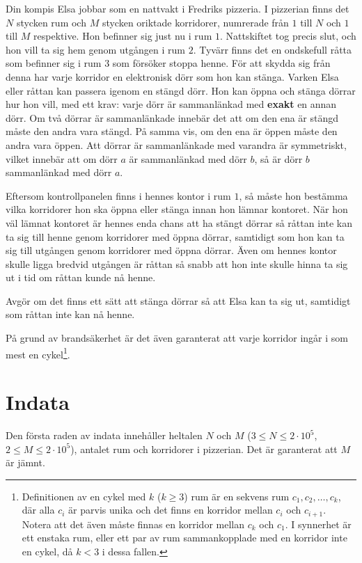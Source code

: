 \noindent

Din kompis Elsa jobbar som en nattvakt i Fredriks pizzeria.
I pizzerian finns det $N$ stycken rum och $M$ stycken oriktade korridorer, numrerade från $1$ till $N$ och $1$ till $M$ respektive.
Hon befinner sig just nu i rum $1$.
Nattskiftet tog precis slut, och hon vill ta sig hem genom utgången i rum $2$.
Tyvärr finns det en ondskefull råtta som befinner sig i rum $3$ som försöker stoppa henne.
För att skydda sig från denna har varje korridor en elektronisk dörr som hon kan stänga.
Varken Elsa eller råttan kan passera igenom en stängd dörr.
Hon kan öppna och stänga dörrar hur hon vill, med ett krav:
varje dörr är sammanlänkad med \textbf{exakt} en annan dörr.
Om två dörrar är sammanlänkade innebär det att om den ena är stängd måste den andra vara stängd.
På samma vis, om den ena är öppen måste den andra vara öppen.
Att dörrar är sammanlänkade med varandra är symmetriskt, vilket innebär att om dörr $a$ är sammanlänkad med dörr $b$, så är dörr $b$ sammanlänkad med dörr $a$.

Eftersom kontrollpanelen finns i hennes kontor i rum $1$, så måste hon bestämma vilka korridorer hon ska öppna eller stänga innan hon lämnar kontoret.
När hon väl lämnat kontoret är hennes enda chans att ha stängt dörrar så råttan inte kan ta sig till henne genom korridorer med öppna dörrar, samtidigt som hon kan ta sig till utgången genom korridorer med öppna dörrar.
Även om hennes kontor skulle ligga bredvid utgången är råttan så snabb att hon inte skulle hinna ta sig ut i tid om råttan kunde nå henne.

Avgör om det finns ett sätt att stänga dörrar så att Elsa kan ta sig ut, samtidigt som råttan
inte kan nå henne.

På grund av brandsäkerhet är det även garanterat att varje korridor ingår i som mest en cykel\footnote{Definitionen av en cykel med $k$ ($k \geq 3$) rum är en sekvens rum $c_1, c_2, \dots, c_k$, där alla $c_i$ är parvis unika och det finns en korridor mellan $c_i$ och $c_{i+1}$. Notera att det även måste finnas en korridor mellan $c_k$ och $c_1$. I synnerhet är ett enstaka rum, eller ett par av rum sammankopplade med en korridor inte en cykel, då $k < 3$ i dessa fallen.}.

\section*{Indata}
Den första raden av indata innehåller heltalen $N$ och $M$ ($3 \leq N \leq 2 \cdot 10^5$, $2 \leq M \leq 2 \cdot 10^5$),
antalet rum och korridorer i pizzerian. Det är garanterat att $M$ är jämnt.

